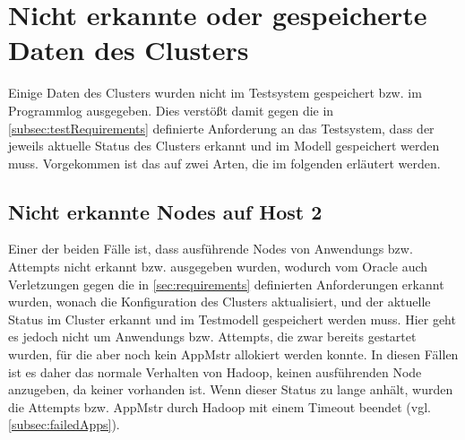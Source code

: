 \section{Nicht erkannte oder gespeicherte Daten des Clusters}
\label{sec:notDetectedData}

Einige Daten des Clusters wurden nicht im Testsystem gespeichert bzw. im Programmlog ausgegeben.
Dies verstößt damit gegen die in \cref{subsec:testRequirements} definierte Anforderung an das Testsystem, dass der jeweils aktuelle Status des Clusters erkannt und im Modell gespeichert werden muss.
Vorgekommen ist das auf zwei Arten, die im folgenden erläutert werden.

\subsection{Nicht erkannte Nodes auf Host 2}
\label{subsec:notDetectedHost2}

Einer der beiden Fälle ist, dass ausführende Nodes von \glspl{Anwendung} bzw. \glspl{Attempt} nicht erkannt bzw. ausgegeben wurden, wodurch vom Oracle auch Verletzungen gegen die in \cref{sec:requirements} definierten Anforderungen erkannt wurden, wonach die Konfiguration des Clusters aktualisiert, und der aktuelle Status im Cluster erkannt und im Testmodell gespeichert werden muss.
Hier geht es jedoch nicht um \glspl{Anwendung} bzw. Attempts, die zwar bereits gestartet wurden, für die aber noch kein \gls{AppMstr} allokiert werden konnte.
In diesen Fällen ist es daher das normale Verhalten von Hadoop, keinen ausführenden Node anzugeben, da keiner vorhanden ist.
Wenn dieser Status zu lange anhält, wurden die \glspl{Attempt} bzw. \gls{AppMstr} durch Hadoop mit einem Timeout beendet (vgl. \cref{subsec:failedApps}).

